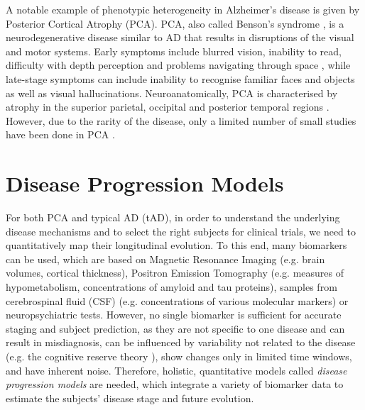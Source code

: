 A notable example of phenotypic heterogeneity in Alzheimer's disease is given by Posterior Cortical Atrophy (PCA). PCA, also called Benson's syndrome \cite{benson1988posterior}, is a neurodegenerative disease similar to AD that results in disruptions of the visual and motor systems. Early symptoms include blurred vision, inability to read, difficulty with depth perception and problems navigating through space \cite{crutch2012posterior, borruat2013posterior}, while late-stage symptoms can include inability to recognise familiar faces and objects as well as visual hallucinations. Neuroanatomically, PCA is characterised by atrophy in the superior parietal, occipital and posterior temporal regions \cite{lehmann2011cortical, whitwell2007imaging}. However, due to the rarity of the disease, only a limited number of small studies have been done in PCA \cite{crutch2012posterior}. 

\section{Disease Progression Models}

For both PCA and typical AD (tAD), in order to understand the underlying disease mechanisms and to select the right subjects for clinical trials, we need to quantitatively map their longitudinal evolution. To this end, many biomarkers can be used, which are based on Magnetic Resonance Imaging (e.g. brain volumes, cortical thickness), Positron Emission Tomography (e.g. measures of hypometabolism, concentrations of amyloid and tau proteins), samples from cerebrospinal fluid (CSF) (e.g. concentrations of various molecular markers) or neuropsychiatric tests.  However, no single biomarker is sufficient for accurate staging and subject prediction, as they are not specific to one disease and can result in misdiagnosis, can be influenced by variability not related to the disease (e.g. the cognitive reserve theory \cite{stern2012cognitive}), show changes only in limited time windows, and have inherent noise. Therefore, holistic, quantitative models called \emph{disease progression models} are needed, which integrate a variety of biomarker data to estimate the subjects' disease stage and future evolution.  


